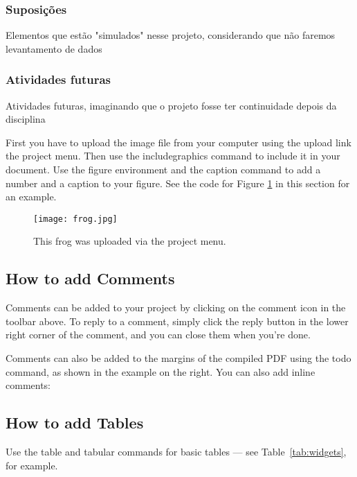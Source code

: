 \documentclass[a4paper]{article}
\begin{document}
\subsubsection{Suposições}
Elementos que estão "simulados" nesse projeto, considerando que não faremos levantamento de dados

\subsubsection{Atividades futuras}
Atividades futuras, imaginando que o projeto fosse ter continuidade depois da disciplina

First you have to upload the image file from your computer using the upload link the project menu. Then use the includegraphics command to include it in your document. Use the figure environment and the caption command to add a number and a caption to your figure. See the code for Figure \ref{fig:frog} in this section for an example.

\begin{figure}
\centering
\texttt{[image: frog.jpg]}
\caption{\label{fig:frog}This frog was uploaded via the project menu.}
\end{figure}

\subsection{How to add Comments}

Comments can be added to your project by clicking on the comment icon in the toolbar above. %
%
%
To reply to a comment, simply click the reply button in the lower right corner of the comment, and you can close them when you're done.

Comments can also be added to the margins of the compiled PDF using the todo command, as shown in the example on the right. You can also add inline comments:


\subsection{How to add Tables}

Use the table and tabular commands for basic tables --- see Table~\ref{tab:widgets}, for example. 
\end{document}
